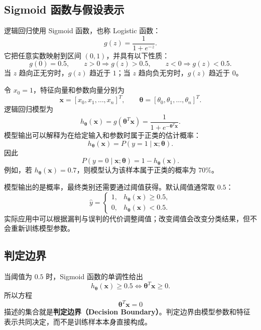 \documentclass[12pt,a4paper]{ctexart}
\newcommand{\concept}[1]{\textbf{\textcolor{DefineColor}{#1}}}
\begin{document}
\subsection{Sigmoid 函数与假设表示}

\begin{definitionbox}[Sigmoid 函数]
逻辑回归使用 Sigmoid 函数，也称 Logistic 函数：
\[
  g(z)=\frac{1}{1+e^{-z}}.
\]
它把任意实数映射到区间 $(0,1)$，并具有以下性质：
\[
  g(0)=0.5,\qquad
  z>0\Rightarrow g(z)>0.5,\qquad
  z<0\Rightarrow g(z)<0.5.
\]
当 $z$ 趋向正无穷时，$g(z)$ 趋近于 $1$；当 $z$ 趋向负无穷时，$g(z)$ 趋近于 $0$。
\end{definitionbox}

\begin{keybox}[逻辑回归模型]
令 $x_0=1$，特征向量和参数向量分别为
\[
  \mathbf{x}=[x_0,x_1,\ldots,x_n]^T,
  \qquad
  \boldsymbol{\theta}=[\theta_0,\theta_1,\ldots,\theta_n]^T.
\]
逻辑回归模型为
\[
  h_{\boldsymbol{\theta}}(\mathbf{x})
  =g\!\left(\boldsymbol{\theta}^{T}\mathbf{x}\right)
  =\frac{1}{1+e^{-\boldsymbol{\theta}^{T}\mathbf{x}}}.
\]
模型输出可以解释为在给定输入和参数时属于正类的估计概率：
\[
  h_{\boldsymbol{\theta}}(\mathbf{x})
  =P(y=1\mid\mathbf{x};\boldsymbol{\theta}).
\]
因此
\[
  P(y=0\mid\mathbf{x};\boldsymbol{\theta})
  =1-h_{\boldsymbol{\theta}}(\mathbf{x}).
\]
例如，若 $h_{\boldsymbol{\theta}}(\mathbf{x})=0.7$，则模型认为该样本属于正类的概率为 $70\%$。
\end{keybox}

\begin{tipbox}[概率与最终类别]
模型输出的是概率，最终类别还需要通过阈值获得。默认阈值通常取 $0.5$：
\[
  \hat y=
  \begin{cases}
    1, & h_{\boldsymbol{\theta}}(\mathbf{x})\geq 0.5,\\
    0, & h_{\boldsymbol{\theta}}(\mathbf{x})<0.5.
  \end{cases}
\]
实际应用中可以根据漏判与误判的代价调整阈值；改变阈值会改变分类结果，但不会重新训练模型参数。
\end{tipbox}

\subsection{判定边界}

\begin{definitionbox}[判定边界]
当阈值为 $0.5$ 时，Sigmoid 函数的单调性给出
\[
  h_{\boldsymbol{\theta}}(\mathbf{x})\geq 0.5
  \Longleftrightarrow
  \boldsymbol{\theta}^{T}\mathbf{x}\geq 0.
\]
所以方程
\[
  \boldsymbol{\theta}^{T}\mathbf{x}=0
\]
描述的集合就是\concept{判定边界（Decision Boundary）}。判定边界由模型参数和特征表示共同决定，而不是训练样本本身直接构成。
\end{definitionbox}
\end{document}
